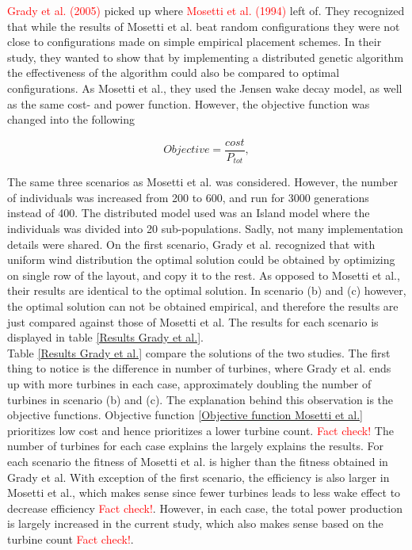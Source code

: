 \noindent \textcolor{red}{Grady et al. (2005)} picked up where \textcolor{red}{Mosetti et al. (1994)} left of. They recognized that while the results of Mosetti et al. beat random configurations they were not close to configurations made on simple empirical placement schemes. In their study, they wanted to show that by implementing a distributed genetic algorithm the effectiveness of the algorithm could also be compared to optimal configurations.	 As Mosetti et al., they used the Jensen wake decay model, as well as the same cost- and power function. However, the objective function was changed into the following

\begin{equation}
Objective = \frac{cost}{P_{tot}},
\label{Objective function Grady et al.}
\end{equation}


\noindent The same three scenarios as Mosetti et al. was considered. However, the number of individuals was increased from 200 to 600, and run for 3000 generations instead of 400. The distributed model used was an Island model where the individuals was divided into 20 sub-populations. Sadly, not many implementation details were shared. On the first scenario, Grady et al. recognized that with uniform wind distribution the optimal solution could be obtained by optimizing on single row of the layout, and copy it to the rest. As opposed to Mosetti et al., their results are identical to the optimal solution. In scenario (b) and (c) however, the optimal solution can not be obtained empirical, and therefore the results are just compared against those of Mosetti et al. The results for each scenario is displayed in table \ref{Results Grady et al.}. \\

\noindent Table \ref{Results Grady et al.} compare the solutions of the two studies. The first thing to notice is the difference in number of turbines, where Grady et al. ends up with more turbines in each case, approximately doubling the number of turbines in scenario (b) and (c). The explanation behind this observation is the objective functions. Objective function \ref{Objective function Mosetti et al.} prioritizes low cost and hence prioritizes a lower turbine count. \textcolor{red}{Fact check!} The number of turbines for each case explains the largely explains the results. For each scenario the fitness of Mosetti et al. is higher than the fitness obtained in Grady et al. With exception of the first scenario, the efficiency is also larger in Mosetti et al., which makes sense since fewer turbines leads to less wake effect to decrease efficiency \textcolor{red}{Fact check!}. However, in each case, the total power production is largely increased in the current study, which also makes sense based on the turbine count \textcolor{red}{Fact check!}. \\


